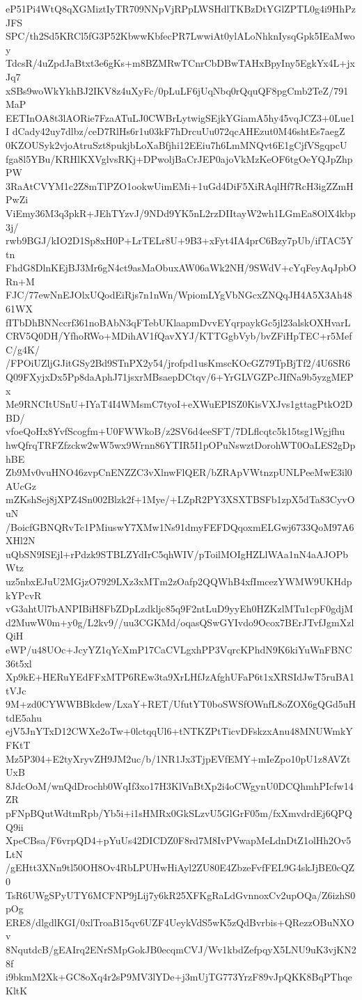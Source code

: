 eP51Pi4WtQ8qXGMiztIyTR709NNpVjRPpLWSHdlTKBzDtYGlZPTL0g4i9HhPzJFS
SPC/th2Sd5KRCl5fG3P52KbwwKbfecPR7LwwiAt0ylALoNhknIysqGpk5IEaMwoy
TdcsR/4uZpdJaBtxt3e6gKs+m8BZMRwTCnrCbDBwTAHxBpyIny5EgkYx4L+jxJq7
xSBs9woWkYkhBJ2IKV8z4uXyFc/0pLuLF6jUqNbq0rQquQF8pgCmb2TeZ/791MaP
EETInOA8t3lAORie7FzaATuLJ0CWBrLytwigSEjkYGiamA5hy45vqJCZ3+0Lue1I
dCady42uy7dlbz/ceD7RlHs6r1u03kF7hDrcuUu072qcAHEzut0M46shtEs7aegZ
0KZOUSyk2vjoAtruSzt8pukjbLoXaBfjhi12EEiu7h6LmMNQvt6E1gCjfVSgqpcU
fga8l5YBu/KRHlKXVglvsRKj+DPwoljBaCrJEP0ajoVkMzKeOF6tgOeYQJpZhpPW
3RaAtCVYM1c2Z8mTlPZO1ookwUimEMi+1uGd4DiF5XiRAqlHf7RcH3igZZmHPwZi
ViEmy36M3q3pkR+JEhTYzvJ/9NDd9YK5nL2rzDIItayW2wh1LGmEa8OlX4kbp3j/
rwb9BGJ/kIO2D1Sp8xH0P+LrTELr8U+9B3+xFyt4IA4prC6Bzy7pUb/ifTAC5Ytn
FhdG8DlnKEjBJ3Mr6gN4ct9asMaObuxAW06aWk2NH/9SWdV+cYqFeyAqJpbORn+M
FJC/77ewNnEJOlxUQodEiRjs7n1nWn/WpiomLYgVbNGcxZNQqJH4A5X3Ah4861WX
fITbDhBNNccrf361noBAbN3qFTebUKlaapmDvvEYqrpaykGc5jl23alskOXHvarL
CRV5Q0DH/YfhoRWo+MDihAV1fQavXYJ/KTTGgbVyb/bvZFiHpTEC+r5MefC/g4K/
/FPOiUZljGJitGSy2Bd9STnPX2y54/jrofpd1usKmscKOcGZ79TpBjTf2/4U6SR6
Q09FXyjxDx5Pp8daAphJ71jsxrMBsaepDCtqv/6+YrGLVGZPcJIfNa9b5yzgMEPx
Me9RNCItUSnU+IYaT4I4WMsmC7tyoI+eXWuEPISZ0KisVXJvs1gttagPtkO2DBD/
vfoeQoHx8YvfScogfm+U0FWWkoB/z2SV6d4eeSFT/7DLflcqtc5k15tsg1Wgjfhu
hwQfrqTRFZfzckw2wW5wx9Wrnn86YTIR5I1pOPuNswztDorohWT0OaLES2gDphBE
Zb9Mv0vuHNO46zvpCnENZZC3vXlnwFlQER/bZRApVWtnzpUNLPeeMwE3il0AUcGz
mZKshSej8jXPZ4Sn002Blzk2f+1Mye/+LZpR2PY3XSXTBSFb1zpX5dTa83CyvOuN
/BoicfGBNQRvTc1PMiuswY7XMw1Ns91dmyFEFDQqoxmELGwj6733QoM97A6XHl2N
uQbSN9ISEjl+rPdzk9STBLZYdIrC5qhWIV/pToilMOIgHZLlWAa1nN4aAJOPbWtz
uz5nbxEJuU2MGjzO7929LXz3xMTm2zOafp2QQWhB4xfImcezYWMW9UKHdpkYPcvR
vG3ahtUl7bANPIBiH8FbZDpLzdkljc85q9F2ntLuD9yyEh0HZKzlMTu1cpF0gdjM
d2MuwW0m+y0g/L2kv9//uu3CGKMd/oqasQSwGYIvdo9Ocox7BErJTvfJgmXzlQiH
eWP/u48UOc+JcyYZ1qYcXmP17CaCVLgxhPP3VqrcKPhdN9K6kiYuWnFBNC36t5xl
Xp9kE+HERuYEdFFxMTP6REw3ta9XrLHfJzAfghUFaP6t1xXRSIdJwT5ruBA1tVJc
9M+zd0CYWWBBkdew/LxaY+RET/UfutYT0boSWSfOWnfL8oZOX6gQGd5uHtdE5ahu
ejV5JnYTxD12CWXe2oTw+0lctqqUl6+tNTKZPtTicvDFskzxAnu48MNUWmkYFKtT
Mz5P304+E2tyXryvZH9JM2uc/b/1NR1Jx3TjpEVfEMY+mIeZpo10pU1z8AVZtUxB
8JdcOoM/wnQdDrochb0WqIf3xo17H3KlVnBtXp2i4oCWgynU0DCQhmhPIcfw14ZR
pFNpBQutWdtmRpb/Yb5i+i1sHMRx0GkSLzvU5GlGrF05m/fxXmvdrdEj6QPQQ9ii
XpeCBsa/F6vrpQD4+pYuUs42DICDZ0F8rd7M8IvPVwapMeLdnDtZ1olHh2Ov5LtN
/gEHtt3XNn9tl50OH8Ov4RbLPUHwHiAyl2ZU80E4ZbzeFvfFEL9G4skJjBE0cQZ0
TsR6UWgSPyUTY6MCFNP9jLij7y6kR25XFKgRaLdGvnnoxCv2upOQa/Z6izhS0pOg
ERE8/dlgdlKGI/0xlTroaB15qv6UZF4UeykVdS5wK5zQdBvrbis+QRezzOBuNXOv
8NqutdcB/gEAIrq2ENrSMpGokJB0ecqmCVJ/Wv1kbdZefpqyX5LNU9uK3vjKN28f
i9bkmM2Xk+GC8oXq4r2sP9MV3lYDe+j3mUjTG773YrzF89vJpQKK8BqPThqeKltK
